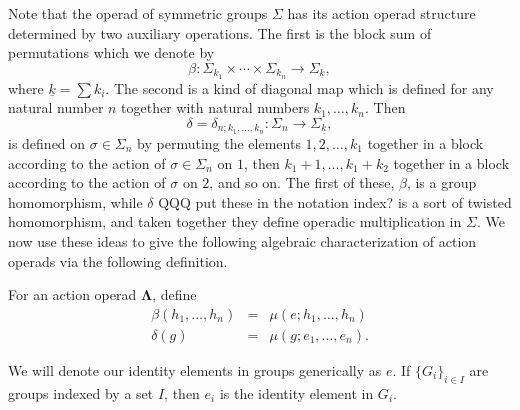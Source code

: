 \documentclass{amsbook} %
\newcommand{\mb}{\mathbf}
\numberwithin{section}{chapter}
\begin{document}
Note that the operad of symmetric groups $\Sigma$ has its action operad structure determined by two auxiliary operations.  The first is the block sum of permutations which we denote by
\[
\beta: \Sigma_{k_{1}} \times \cdots \times \Sigma_{k_{n}} \rightarrow \Sigma_{\underline{k}},
\]
where $\underline{k} = \sum k_{i}$.  The second is a kind of diagonal map which is defined for any natural number $n$ together with natural numbers $k_{1}, \ldots, k_{n}$.  Then
\[
\delta = \delta_{n; k_{1}, \ldots, k_{n}}:\Sigma_{n} \rightarrow \Sigma_{\underline{k}},
\]
is defined on $\sigma \in \Sigma_{n}$ by permuting the elements $1, 2, \ldots, k_{1}$ together in a block according to the action of $\sigma \in \Sigma_{n}$ on $1$, then $k_{1}+1, \ldots, k_{1}+k_{2}$ together in a block according to the action of $\sigma$ on $2$, and so on.  The first of these, $\beta$, is a group homomorphism, while $\delta$ QQQ put these in the notation index? is a sort of twisted homomorphism, and taken together they define operadic multiplication in $\Sigma$.  We now use these ideas to give the following algebraic characterization of action operads via the following definition.

\begin{Defi}\label{Defi:aop_bl}
For an action operad $\mb{\Lambda}$,  define
\[
\begin{array}{rcl}
\beta(h_{1}, \ldots, h_{n}) &=& \mu(e; h_{1}, \ldots, h_{n}) \\
\delta(g) &=& \mu(g; e_{1}, \ldots, e_{n}).
\end{array}
\]
\end{Defi}

\begin{nota}
We will denote our identity elements in groups generically as $e$. If $\{ G_{i} \}_{i \in I}$ are groups indexed by a set $I$, then $e_{i}$ is the identity element in $G_{i}$.
\end{nota}
\end{document}
